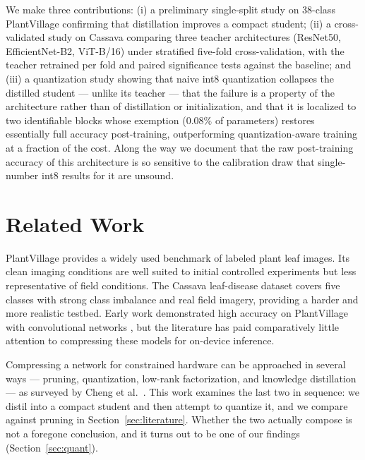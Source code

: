 \documentclass[conference]{IEEEtran}
\begin{document}
We make three contributions: (i) a preliminary single-split study on 38-class
PlantVillage confirming that distillation improves a compact student; (ii) a
cross-validated study on Cassava comparing three teacher architectures
(ResNet50, EfficientNet-B2, ViT-B/16) under stratified five-fold
cross-validation, with the teacher retrained per fold and paired significance
tests against the baseline; and (iii) a quantization study showing that naive
int8 quantization collapses the distilled student --- unlike its teacher ---
that the failure is a property of the architecture rather than of distillation or
initialization, and that it is localized to two identifiable blocks whose
exemption ($0.08\%$ of parameters) restores essentially full accuracy
post-training, outperforming quantization-aware training at a fraction of the
cost. Along the way we document that the raw post-training accuracy of this
architecture is so sensitive to the calibration draw that single-number int8
results for it are unsound.

\section{Related Work}

PlantVillage \cite{hughes2015open} provides a widely used benchmark of labeled
plant leaf images. Its clean imaging conditions are well suited to initial
controlled experiments but less representative of field conditions. The Cassava
leaf-disease dataset \cite{sankalana2021cassava} covers five classes with
strong class imbalance and real field imagery, providing a harder and more
realistic testbed. Early work demonstrated high accuracy on PlantVillage with
convolutional networks \cite{mohanty2016using}, but the literature has paid
comparatively little attention to compressing these models for on-device
inference.

Compressing a network for constrained hardware can be approached in several
ways --- pruning, quantization, low-rank factorization, and knowledge
distillation --- as surveyed by Cheng et al.\ \cite{cheng2018model}. This work
examines the last two in sequence: we distil into a compact student and then
attempt to quantize it, and we compare against pruning in
Section~\ref{sec:literature}. Whether the two actually compose is not a
foregone conclusion, and it turns out to be one of our findings
(Section~\ref{sec:quant}).
\end{document}
